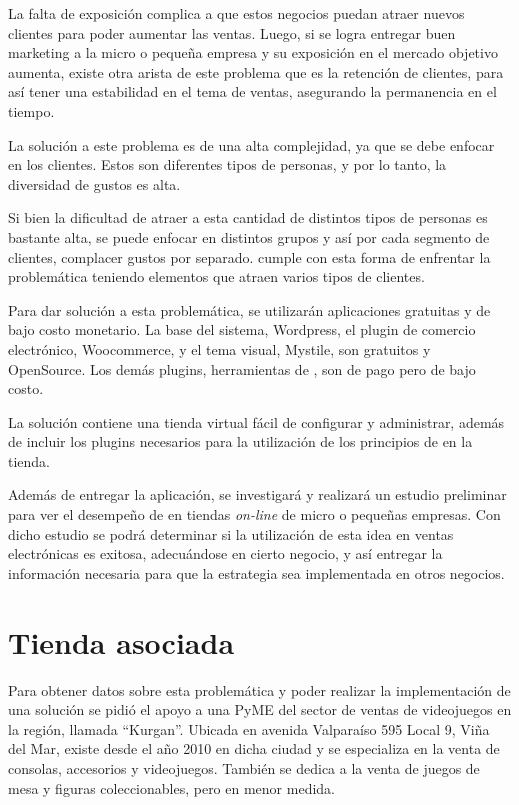 La falta de exposición complica a que estos negocios puedan atraer nuevos clientes
para poder aumentar las ventas.
Luego, si se logra entregar buen marketing a la micro o pequeña empresa y su
exposición en el mercado objetivo aumenta, existe otra arista de este problema
que es la retención de clientes, para así tener una estabilidad en el tema
de ventas, asegurando la permanencia en el tiempo.

La solución a este problema es de una alta complejidad, ya que se debe enfocar en
los clientes.
Estos son diferentes tipos de personas, y por lo tanto, la diversidad de gustos es
alta.

Si bien la dificultad de atraer a esta cantidad de distintos tipos de personas
es bastante alta, se puede enfocar en distintos grupos y así por cada segmento
de clientes, complacer gustos por separado.
{\GAM} cumple con esta forma de enfrentar la problemática teniendo elementos que
atraen varios tipos de clientes.

Para dar solución a esta problemática, se utilizarán aplicaciones gratuitas y de
bajo costo monetario. La base del sistema, Wordpress, el plugin de comercio
electrónico, Woocommerce, y el tema visual, Mystile, son gratuitos y OpenSource.
Los demás plugins, herramientas de {\gam}, son de pago pero de bajo costo.

La solución contiene una tienda virtual fácil de configurar y administrar,
además de incluir los plugins necesarios para la utilización de los principios
de {\gam} en la tienda.

Además de entregar la aplicación, se investigará y realizará un estudio preliminar
para ver el desempeño de {\gam} en tiendas \emph{on-line} de micro o pequeñas empresas.
Con dicho estudio se podrá determinar si la utilización de esta idea en ventas
electrónicas es exitosa, adecuándose en cierto negocio,
y así entregar la información necesaria para que la estrategia sea implementada
en otros negocios.

\section{Tienda asociada}

Para obtener datos sobre esta problemática y poder realizar la implementación de una
solución se pidió el apoyo a una PyME del sector de ventas de videojuegos en la región,
llamada ``Kurgan''. Ubicada en avenida Valparaíso 595 Local 9, Viña del Mar, existe desde
el año 2010 en dicha ciudad y se especializa en la venta de consolas, accesorios y videojuegos.
También se dedica a la venta de juegos de mesa y figuras coleccionables, pero en menor medida.


